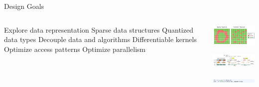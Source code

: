 \placelogofalse
\begin{frame}{Design Goals}
\begin{columns}
  \begin{outline}
    \1 Explore data representation 
    \2 Sparse data structures
    \2 Quantized data types
    \1 Decouple data and algorithms
    \1 Differentiable kernels
    \1 Optimize access patterns
    \1 Optimize parallelism
  \end{outline}

  \centering
  \begin{center}
  \includegraphics[width=5.0cm]{taichi_sparsity.png}

  \vspace{0.75cm}

  \includegraphics[width=6.0cm]{access_pattern.png}

  \vspace{0.75cm}

  \includegraphics[width=6.0cm]{quantized_types.png}
  \end{center}
\end{columns}
\end{frame}
\placelogotrue
